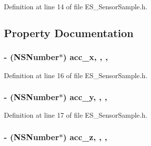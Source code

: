 Definition at line 14 of file E\+S\+\_\+\+Sensor\+Sample.\+h.



\subsection{Property Documentation}
\hypertarget{interface_e_s___sensor_sample_a048178c83dc5bd7a42e1dea8ac8fb121}{
\subsubsection[{acc\+\_\+x}]{\setlength{\rightskip}{0pt plus 5cm}-\/ (N\+S\+Number$\ast$) acc\+\_\+x\hspace{0.3cm}{\ttfamily [read]}, {\ttfamily [write]}, {\ttfamily [nonatomic]}, {\ttfamily [retain]}}}\label{interface_e_s___sensor_sample_a048178c83dc5bd7a42e1dea8ac8fb121}


Definition at line 16 of file E\+S\+\_\+\+Sensor\+Sample.\+h.

\hypertarget{interface_e_s___sensor_sample_a24f0e23ee6eedb5de9c597e25da131bd}{
\subsubsection[{acc\+\_\+y}]{\setlength{\rightskip}{0pt plus 5cm}-\/ (N\+S\+Number$\ast$) acc\+\_\+y\hspace{0.3cm}{\ttfamily [read]}, {\ttfamily [write]}, {\ttfamily [nonatomic]}, {\ttfamily [retain]}}}\label{interface_e_s___sensor_sample_a24f0e23ee6eedb5de9c597e25da131bd}


Definition at line 17 of file E\+S\+\_\+\+Sensor\+Sample.\+h.

\hypertarget{interface_e_s___sensor_sample_af47261f579b98eb8547e8b3ab4713169}{
\subsubsection[{acc\+\_\+z}]{\setlength{\rightskip}{0pt plus 5cm}-\/ (N\+S\+Number$\ast$) acc\+\_\+z\hspace{0.3cm}{\ttfamily [read]}, {\ttfamily [write]}, {\ttfamily [nonatomic]}, {\ttfamily [retain]}}}\label{interface_e_s___sensor_sample_af47261f579b98eb8547e8b3ab4713169}


